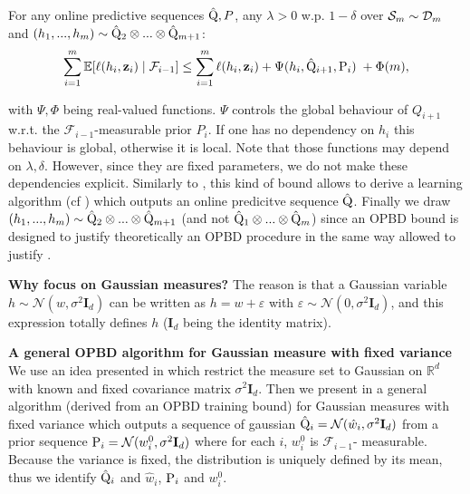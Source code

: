 For any online predictive sequences $\hat{\Q},P$, any $\lambda>0$ w.p. $1-\delta$ over $\Sm\sim\Dm$ and $(h_1,...,h_{m})\sim \hat{\Q}_2\otimes...\otimes \hat{\Q}_{m+1}$:
\begin{align}
  \label{eq: OPBD_train_bound}
  \sum_{i=1}^m  \mathbb{E}[\ell(h_i,\z_i) \mid \mathcal{F}_{i-1}]   \leq \sum_{i=1}^m  \ell(h_i,\z_i)  + \Psi(h_{i},\hat{\Q}_{i+1},\P_{i}) \; + \Phi(m),
\end{align}

with $\Psi,\Phi$ being real-valued functions. $\Psi$ controls the global behaviour of $Q_{i+1}$ w.r.t. the $\mathcal{F}_{i-1}$-measurable prior $P_{i}$. If one has no dependency on $h_i$ this behaviour is global, otherwise it is local.
Note that those functions may depend on $\lambda,\delta$. However, since they are fixed parameters, we do not make these dependencies explicit.
Similarly to , this kind of bound allows to derive a learning algorithm (cf ) which outputs an online predicitve sequence $\hat{\Q}$.
Finally we draw $(h_1,...,h_{m})\sim \hat{\Q}_2\otimes...\otimes \hat{\Q}_{m+1}$ (and not $\hat{\Q}_1\otimes...\otimes \hat{\Q}_{m}$)  since an OPBD bound is designed to justify theoretically an OPBD procedure in the same way  allowed to justify .


\textbf{Why focus on Gaussian measures?} The reason is that a Gaussian variable $h\sim\mathcal{N}(w,\sigma^2\mathbf{I}_d)$ can be written as $h=w +\varepsilon$ with $\varepsilon\sim\mathcal{N}(0,\sigma^2\mathbf{I}_d)$, and this expression totally defines $h$ ($\mathbf{I}_d$ being the identity matrix).

\textbf{A general OPBD algorithm for Gaussian measure with fixed variance} We use an idea presented in \citet{viallard2023general} which restrict the measure set to Gaussian on $\mathbb{R}^d$ with known and fixed covariance matrix $\sigma^2 \mathbf{I}_d$.
Then we present in  a general algorithm (derived from an OPBD training bound) for Gaussian measures with fixed variance which outputs a sequence of gaussian $\hat{\Q}_i=\mathcal{N}(\hat{w}_i,\sigma^2\mathbf{I}_d)$ from a prior sequence $\P_{i}= \mathcal{N}(w_i^0,\sigma^2\mathbf{I}_d)$
where for each $i$, $w_i^0$ is $\mathcal{F}_{i-1}$- measurable. Because the variance is fixed, the distribution is uniquely defined by its mean, thus we identify $\hat{\Q}_i$ and $\hat{w}_i$, $\P_{i}$ and $w_i^0$.


